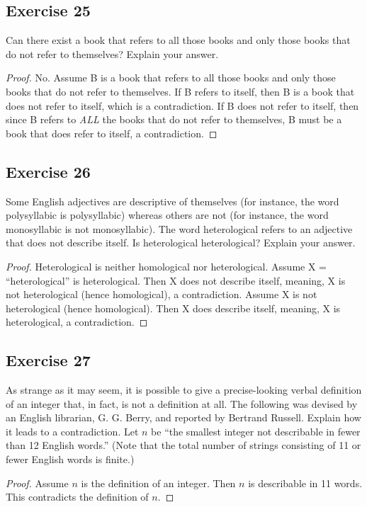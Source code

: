 \documentclass[14pt]{extarticle}
\begin{document}
\subsection{Exercise 25}
Can there exist a book that refers to all those books and only those books that do not refer to themselves?
Explain your answer.

\begin{proof}
  No. Assume B is a book that refers to all those books and only those books that do not refer to themselves. If B
  refers to itself, then B is a book that does not refer to itself, which is a contradiction. If B does not refer to
  itself, then since B refers to {\it ALL} the books that do not refer to themselves, B must be a book that does refer
  to itself, a contradiction.
\end{proof}

\subsection{Exercise 26}
Some English adjectives are descriptive of themselves (for instance, the word polysyllabic is polysyllabic) whereas
others are not (for instance, the word monosyllabic is not monosyllabic). The word heterological refers to an
adjective that does not describe itself. Is heterological heterological? Explain your answer.

\begin{proof}
  Heterological is neither homological nor heterological. Assume X = ``heterological'' is heterological. Then X does
  not describe itself, meaning, X is not heterological (hence  homological), a contradiction. Assume X is not
  heterological (hence homological). Then X does describe itself, meaning, X is heterological, a contradiction.
\end{proof}

\subsection{Exercise 27}
As strange as it may seem, it is possible to give a precise-looking verbal definition of an integer that, in
fact, is not a definition at all. The following was devised by an English librarian, G. G. Berry, and reported by
Bertrand Russell. Explain how it leads to a contradiction. Let $n$ be “the smallest integer not describable in fewer
than 12 English words.” (Note that the total number of strings consisting of 11 or fewer English words is finite.)

\begin{proof}
  Assume $n$ is the definition of an integer. Then $n$ is describable in 11 words. This contradicts the definition of $n$.
\end{proof}
\end{document}
